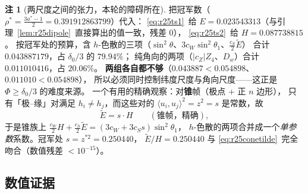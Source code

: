\documentclass[UTF8,11pt]{ctexart}
\theoremstyle{definition}
\newtheorem{remark}[theorem]{注}
\begin{document}
\begin{remark}[两尺度之间的张力，本轮的障碍所在]\label{rem:r25tension}
把冠军数（$\rho^*=\frac{3a^*-1}2=0.391912863799$）代入：
\eqref{eq:r25ts1}~给 $E=0.023543313$（与引理~\ref{lem:r25dipole}~直接算出的值一致，残差 $0$），
\eqref{eq:r25ts2}~给 $H=0.087738815$。
按冠军处的预算，含 $h$-色散的三项（$\sin^2\theta$、$3c_W\sin^2\theta_1$、$\frac{c_S}2\widetilde E$）
合计 $0.043887179$，占 $\delta_0/3$ 的 $79.94\%$；
纯角向的两项（$|c_Z|Z_4$、$D_w$）合计 $0.011010416$，占 $20.06\%$。
\textbf{两组各自都不够}（$0.043887<0.054898$、$0.011010<0.054898$），
所以必须同时控制纬度尺度与角向尺度——这正是 $\Phi\ge\delta_0/3$ 的难度来源。
一个有用的精确观察：对\textbf{锥}帧（极点 $+$ 正 $n$ 边形），
只有「极--缘」对满足 $h_i\ne h_j$，而这些对的 $\langle u_i,u_j\rangle^2=z^2=s$ 是常数，故
\begin{equation}\label{eq:r25conetilde}
\widetilde E=s\cdot H\qquad(\text{锥帧，精确}),
\end{equation}
于是锥族上 $\frac{c_W}2H+\frac{c_S}2\widetilde E=(3c_W+3c_Ss)\sin^2\theta_1$，
$h$-色散的两项合并成一个\emph{单参数}系数。冠军处 $s=z^{*2}=0.250440$，
$\widetilde E/H=0.250440$ 与 \eqref{eq:r25conetilde}~完全吻合（数值残差 $<10^{-15}$）。
\end{remark}

\subsection{数值证据}\label{sec:r25:num}
\end{document}
